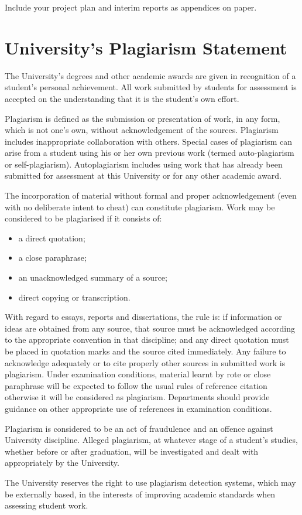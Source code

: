 \documentclass[a4paper,12pt]{article}
\begin{document}
Include your project plan and interim reports as appendices on paper.

\section{University's Plagiarism Statement}
\label{plagiarism sect}

The University's degrees and other academic awards are given in recognition of a student's personal achievement. All work submitted by students for assessment is accepted on the understanding that it is the student's own effort. 

Plagiarism is defined as the submission or presentation of work, in any form, which is not one's own, without acknowledgement of the sources. Plagiarism includes inappropriate collaboration with others. Special cases of plagiarism can arise from a student using his or her own previous work (termed auto-plagiarism or self-plagiarism). Autoplagiarism includes using work that has already been submitted for assessment at this University or for any other academic award.

The incorporation of material without formal and proper acknowledgement (even with no deliberate intent to cheat) can constitute plagiarism. Work may be considered to be plagiarised if it consists of: 
\begin{itemize}
\item
a direct quotation; 
\item
a close paraphrase; 
\item
an unacknowledged summary of a source; 
\item
direct copying or transcription.
\end{itemize}
With regard to essays, reports and dissertations, the rule is: if information or ideas are obtained from any source, that source must be acknowledged according to the appropriate convention in that discipline; and any direct quotation must be placed in quotation marks and the source cited immediately. Any failure to acknowledge adequately or to cite properly other sources in submitted work is plagiarism. Under examination conditions, material learnt by rote or close paraphrase will be expected to follow the usual rules of reference citation otherwise it will be considered as plagiarism. Departments should provide guidance on other appropriate use of references in examination conditions. 

Plagiarism is considered to be an act of fraudulence and an offence against University discipline. Alleged plagiarism, at whatever stage of a student's studies, whether before or after graduation, will be investigated and dealt with appropriately by the University.

The University reserves the right to use plagiarism detection systems, which may be externally based, in the interests of improving academic standards when assessing student work.
\end{document}
